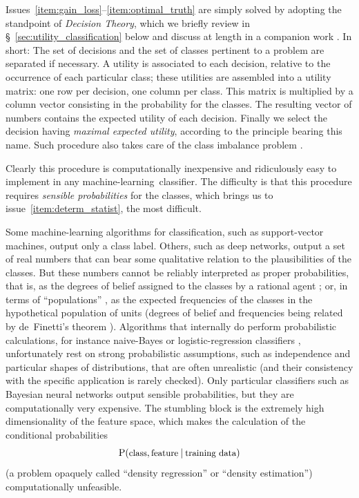 \documentclass[a4paper,12pt,%
onecolumn,oneside,article,%
british%
]{memoir}
\renewcommand*{\P}{\mathrm{P}}%
\renewcommand*{\|}[1][]{\nonscript\:#1\vert\nonscript\:\mathopen{}}
\newcommand*{\sect}{\S}%
\newcommand*{\sects}{\S\S}%
\newcommand*{\chap}{ch.}%
\newcommand*{\chaps}{chs}%
\newcommand*{\cf}{{cf.}}
\newcommand*{\texts}[1]{\text{\small #1}}
\newcommand*{\ml}{machine-learning}
\begin{document}
Issues~\ref{item:gain_loss}--\ref{item:optimal_truth} are simply solved by adopting the standpoint of \emph{Decision Theory}, which we briefly review in \sect~\ref{sec:utility_classification} below and discuss at length in a companion work \autocites{dyrlandetal2022}. In short: The set of decisions and the set of classes pertinent to a problem are separated if necessary. A utility is associated to each decision, relative to the occurrence of each particular class; these utilities are assembled into a utility matrix: one row per decision, one column per class. This matrix is multiplied by a column vector consisting in the probability for the classes. The resulting vector of numbers contains the expected utility of each decision. Finally we select the decision having \emph{maximal expected utility}, according to the principle bearing this name. Such procedure also takes care of the class imbalance problem \autocites[\cf\ the analysis by][(they use the term \enquote{cost} instead of \enquote{utility})]{drummondetal2005}.

Clearly this procedure is computationally inexpensive and ridiculously easy to implement in any \ml\ classifier. The difficulty is that this procedure requires \emph{sensible probabilities} \autocites[\enquote*{credibilities  would be agreed by all rational men if there were any rational men}][]{good1966} for the classes, which brings us to issue~\ref{item:determ_statist}, the most difficult.

Some machine-learning algorithms for classification, such as support-vector machines, output only a class label. Others, such as deep networks, output a set of real numbers that can bear some qualitative relation to the plausibilities of the classes. But these numbers cannot be reliably interpreted as proper probabilities, that is, as the degrees of belief assigned to the classes by a rational agent \autocites{mackay1992d,galetal2016}[\chaps~2, 12, 13]{russelletal1995_r2022}; or, in terms of \enquote{populations} \autocites{lindleyetal1981}%
, as the expected frequencies of the classes in the hypothetical population of units (degrees of belief and frequencies being related by de~Finetti's theorem \autocites[\chap~4]{bernardoetal1994_r2000}{dawid2013}). Algorithms that internally do perform probabilistic calculations, for instance naive-Bayes or logistic-regression classifiers \autocites[\sect~3.5, \chap~8]{murphy2012}[\sects~8.2, 4.3]{bishop2006}[\chap~10, \sect~17.4]{barber2007_r2020}, unfortunately rest on strong probabilistic assumptions, such as independence and particular shapes of distributions, that are often unrealistic (and their consistency with the specific application is rarely checked). Only particular classifiers such as Bayesian neural networks \autocites{nealetal2006}[\sect~5.7]{bishop2006} output sensible probabilities, but they are computationally very expensive. The stumbling block is the extremely high dimensionality of the feature space, which makes the calculation of the conditional probabilities
\[
  \P(\texts{class}, \texts{feature} \| \texts{training data})
\]
(a problem opaquely called \enquote{density regression} or \enquote{density estimation}\autocites{ferguson1983,thorburn1986,hjort1996,dunsonetal2007}) computationally unfeasible.
\end{document}
